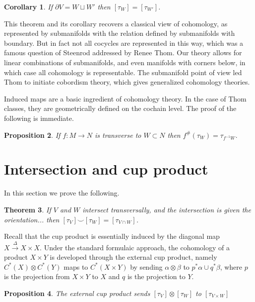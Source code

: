 \documentclass{amsart}          %
\newtheorem{theorem}{Theorem}
\newtheorem{corollary}[theorem]{Corollary}
\newtheorem{proposition}[theorem]{Proposition}
\begin{document}
\begin{corollary}
If $\partial V = W \sqcup W'$ then $[\tau_W] = [\tau_{W'}]$.
\end{corollary}

This theorem and its
corollary recovers a classical view of cohomology, as represented by submanifolds with the relation defined by submanifolds with boundary.  But in fact
not all cocycles are represented in this way, which was a famous question of Steenrod addressed by Renee Thom.  Our theory allows for linear combinations
of submanifolds, and even manifolds with corners below, in which case all cohomology is representable.  The submanifold point of view led Thom
to initiate cobordism theory, which gives generalized cohomology theories.

Induced maps are a basic ingredient of cohomology theory.  In the case of Thom classes, they are geometrically defined on the cochain level.  The
proof of the following is immediate.

\begin{proposition}\label{pullback}
If $f : M \to N$ is transverse to $W \subset N$ then $f^{\#}(\tau_{W}) = \tau_{f^{-1} W}$.
\end{proposition}



\section{Intersection and cup product}

In this section we prove the following.

\begin{theorem}
If $V$ and $W$ intersect transversally, and the intersection is given the orientation... then $[\tau_{V}] \smile [\tau_W] = [\tau_{V \cap W}]$.
\end{theorem}

Recall that the cup product is essentially induced by the diagonal map $X \overset{\Delta}{\to} X \times X$.  Under the standard
formulaic approach, the cohomology of a product $X \times Y$ is developed through the external cup product, namely $C^*(X) \otimes C^*(Y)$
maps to $C^*(X \times Y)$ by sending $\alpha  \otimes \beta$ to $p^* \alpha \cup q^*\beta$, where $p$ is the projection from 
$X \times Y$ to $X$ and $q$ is the projection to $Y$.

\begin{proposition}\label{externalcup}
The external cup product sends $[\tau_V] \otimes [\tau_W]$ to $[\tau_{V \times W}]$
\end{proposition}
\end{document}
